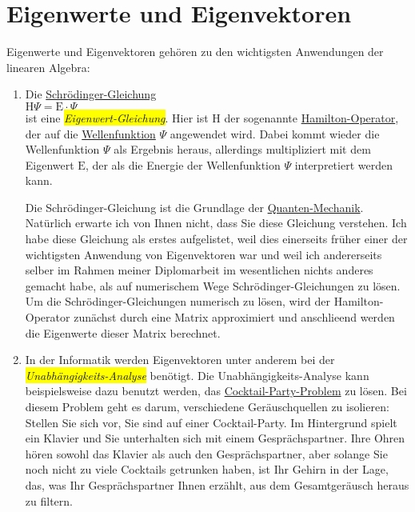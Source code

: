 \chapter{Eigenwerte und Eigenvektoren}
Eigenwerte und Eigenvektoren geh\"oren zu den wichtigsten Anwendungen der linearen Algebra:
\begin{enumerate}
\item Die \href{http://de.wikipedia.org/wiki/Schr\"odingergleichung}{Schr\"odinger-Gleichung}
      \\[0.2cm]
      \hspace*{1.3cm}
      $\mathrm{H} \Psi = \mathrm{E} \cdot \Psi$
      \\[0.2cm]
      ist eine \colorbox{yellow}{\emph{Eigenwert-Gleichung}}.  Hier ist $\mathrm{H}$ der sogenannte
      \href{http://de.wikipedia.org/wiki/Hamilton-Operator}{Hamilton-Operator}, der auf die
      \href{http://de.wikipedia.org/wiki/Wellenfunktion}{Wellenfunktion} $\Psi$ angewendet wird.
      Dabei kommt wieder die Wellenfunktion $\Psi$ als Ergebnis heraus, allerdings multipliziert mit
      dem Eigenwert $\mathrm{E}$, der als die Energie der Wellenfunktion $\Psi$ interpretiert werden kann.

      Die Schr\"odinger-Gleichung ist die Grundlage der \href{http://de.wikipedia.org/wiki/Quantenmechanik}{Quanten-Mechanik}.
      Nat\"urlich erwarte ich von Ihnen nicht, dass Sie diese Gleichung verstehen.  Ich habe diese
      Gleichung als erstes aufgelistet, weil dies einerseits fr\"uher einer der wichtigsten Anwendung von
      Eigenvektoren war und weil ich andererseits selber im Rahmen meiner Diplomarbeit im
      wesentlichen nichts anderes gemacht habe, als auf numerischem Wege Schr\"odinger-Gleichungen zu
      l\"osen.  Um die Schr\"odinger-Gleichungen numerisch zu l\"osen, wird der Hamilton-Operator zun\"achst
      durch eine Matrix approximiert und anschlie\3end werden die Eigenwerte dieser Matrix berechnet.
\item In der Informatik werden Eigenvektoren unter anderem bei der 
      \colorbox{yellow}{\emph{Unabh\"angigkeits-Analyse}} ben\"otigt.  Die Unabh\"angigkeits-Analyse
      kann beispielsweise dazu benutzt werden, das
      \href{http://research.ics.aalto.fi/ica/cocktail/cocktail_en.cgi}{Cocktail-Party-Problem} zu l\"osen.
      Bei diesem Problem geht es darum, verschiedene Ger\"auschquellen zu isolieren:  Stellen
      Sie sich vor, Sie sind auf einer Cocktail-Party.  Im Hintergrund spielt ein Klavier und Sie
      unterhalten sich mit einem Gespr\"achspartner.  Ihre Ohren h\"oren sowohl das Klavier als auch den
      Gespr\"achspartner, aber solange Sie noch nicht zu viele Cocktails getrunken haben, ist Ihr
      Gehirn in der Lage, das, was Ihr Gespr\"achspartner Ihnen erz\"ahlt, aus 
      dem Gesamtger\"ausch heraus zu filtern.  


\end{enumerate}
